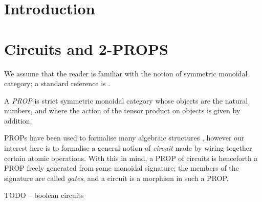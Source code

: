 \documentclass[a4paper]{article}
\begin{document}
\maketitle



\section{Introduction}
\label{sec:intro}

\section{Circuits and 2-PROPS}
\label{sec:prelim}

We assume that the reader is familiar with the notion of symmetric
monoidal category; a standard reference is
\cite{MacLane:CatsWM:1971}.  

\begin{definition} \label{def:PROP}
  A \emph{PROP} is strict symmetric monoidal category whose objects
  are the natural numbers, and where the action of the tensor product on
  objects is given by addition.
\end{definition}

PROPs have been used to formalise many algebraic structures
\cite{Lack:2004sf}, however our interest here is to formalise a
general notion of \emph{circuit} made by wiring together certain
atomic operations.  With this in mind, a PROP of circuits is
henceforth a PROP freely generated from some monoidal signature; the
members of the signature are called \emph{gates}, and a circuit is
a morphism in such a PROP.

\begin{example} \label{ex:boolean-circs}
  TODO -- boolean circuits
\end{example}
\end{document}

